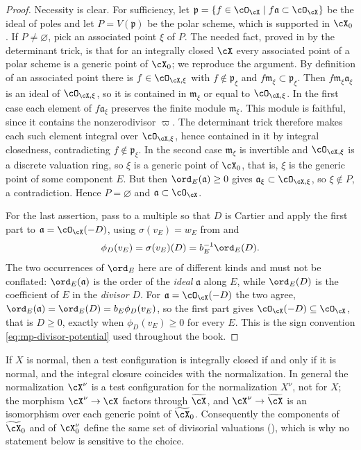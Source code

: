 \begin{proof}
Necessity is clear.  For sufficiency, let
$\mathfrak p=\{f\in\cO_{\cX}\mid f\mathfrak a\subset\cO_{\cX}\}$ be the
ideal of poles and let $P=V(\mathfrak p)$ be the polar scheme, which is
supported in $\cX_0$.  If $P\ne\varnothing$, pick an associated point
$\xi$ of $P$.  The needed fact, proved in \cite[Lemma~1.19]{BJ22} by the
determinant trick, is that for an integrally closed $\cX$ every associated
point of a polar scheme is a generic point of $\cX_0$; we reproduce the
argument.  By definition of an associated point there is
$f\in\cO_{\cX,\xi}$ with $f\notin\mathfrak p_\xi$ and
$f\mathfrak m_\xi\subset\mathfrak p_\xi$.  Then
$f\mathfrak m_\xi\mathfrak a_\xi$ is an ideal of $\cO_{\cX,\xi}$, so it
is contained in $\mathfrak m_\xi$ or equal to $\cO_{\cX,\xi}$.  In the
first case each element of $f\mathfrak a_\xi$ preserves the finite
module $\mathfrak m_\xi$.  This module is faithful, since it contains
the nonzerodivisor $\varpi$.  The determinant trick therefore makes
each such element integral over $\cO_{\cX,\xi}$, hence contained in it by integral closedness,
contradicting $f\notin\mathfrak p_\xi$.  In the second case
$\mathfrak m_\xi$ is invertible and $\cO_{\cX,\xi}$ is a discrete
valuation ring, so $\xi$ is a generic point of $\cX_0$, that is,
$\xi$ is the generic point of some component $E$.  But then
$\ord_E(\mathfrak a)\geq0$ gives
$\mathfrak a_\xi\subset\cO_{\cX,\xi}$, so $\xi\notin P$, a
contradiction.  Hence $P=\varnothing$ and
$\mathfrak a\subset\cO_{\cX}$.

For the last assertion, pass to a multiple so that $D$ is Cartier and
apply the first part to $\mathfrak a=\cO_{\cX}(-D)$, using
$\sigma(v_E)=w_E$ from  and
\[
 \phi_D(v_E)=\sigma(v_E)(D)=b_E^{-1}\ord_E(D).
\]
The two occurrences of $\ord_E$ here are of different kinds and must not
be conflated: $\ord_E(\mathfrak a)$ is the order of the \emph{ideal}
$\mathfrak a$ along $E$, while $\ord_E(D)$ is the coefficient of $E$
in the \emph{divisor} $D$.  For $\mathfrak a=\cO_{\cX}(-D)$ the two
agree, $\ord_E(\mathfrak a)=\ord_E(D)=b_E\phi_D(v_E)$, so the first part
gives $\cO_{\cX}(-D)\subseteq\cO_{\cX}$, that is $D\geq0$, exactly when
$\phi_D(v_E)\geq0$ for every $E$.  This is the sign convention
\eqref{eq:mp-divisor-potential} used throughout the book.
\end{proof}

\begin{remark}
\label{rem:ch33-normalization-vs-integral-closure}
If $X$ is normal, then a test configuration is integrally closed if and
only if it is normal, and the integral closure coincides with the
normalization.  In general the normalization $\cX^\nu$ is a test
configuration for the normalization $X^\nu$, not for $X$; the morphism
$\cX^\nu\to\cX$ factors through $\widetilde\cX$, and
$\cX^\nu\to\widetilde\cX$ is an isomorphism over each generic point of
$\widetilde\cX_0$.  Consequently the components of $\widetilde\cX_0$ and
of $\cX^\nu_0$ define the same set of divisorial valuations
(\cite[Remark~1.22]{BJ22}), which is why no statement below is sensitive to
the choice.
\end{remark}

